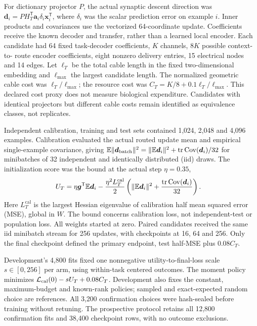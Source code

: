For dictionary projector $P$, the actual synaptic descent direction was
$\bm d_i=P H_T^{\mathsf T}\bm a_i\delta_i\bm x_i^{\mathsf T}$,
where $\delta_i$ was the scalar prediction error on example $i$. Inner products and covariances use the vectorized 64-coordinate update. Coefficients receive the known decoder and transfer, rather than a learned local encoder. Each candidate had
64 fixed task-decoder coefficients, $K$ channels, $8K$ possible context-to-
route encoder coefficients, eight nonzero delivery entries, 15 electrical
nodes and 14 edges. Let $\ell_T$ be the total cable length in the fixed two-dimensional
embedding and $\ell_{\max}$ the largest candidate length. The normalized
geometric cable cost was $\ell_T/\ell_{\max}$; the resource cost was
$C_T=K/8+0.1\ell_T/\ell_{\max}$. This declared cost proxy does not measure biological expenditure. Candidates with identical projectors but different cable costs remain identified as equivalence classes, not replicates.

Independent calibration, training and test sets contained 1,024, 2,048 and
4,096 examples. Calibration evaluated the actual routed update mean and
empirical single-example covariance, giving
$\mathbb{E}\|\bm d_{\mathrm{batch}}\|^2
=\|\mathbb{E}\bm d_i\|^2+\operatorname{tr}\operatorname{Cov}(\bm d_i)/32$
for minibatches of 32 independent and identically distributed (iid) draws. The initialization score was the bound at the
actual step $\eta=0.35$,
\[
U_T=\eta\bm g^{\mathsf T}\mathbb{E}\bm d_i-
\frac{\eta^2L_T^{\mathrm{cal}}}{2}
\left(\|\mathbb{E}\bm d_i\|^2+
\frac{\operatorname{tr}\operatorname{Cov}(\bm d_i)}{32}\right).
\]
Here $L_T^{\mathrm{cal}}$ is the largest Hessian eigenvalue of calibration half mean squared error (MSE), global in $W$. The bound concerns calibration loss, not independent-test or population loss. All weights
started at zero. Paired candidates received the same iid minibatch stream
for 256 updates, with checkpoints at 16, 64 and 256. Only the final checkpoint
defined the primary endpoint, test half-MSE plus $0.08C_T$.

Development's 4,800 fits fixed one nonnegative utility-to-final-loss scale $s\in[0,256]$ per arm, using within-task centered outcomes. The moment policy minimizes $\mathcal L_{\rm cal}(0)-sU_T+0.08C_T$. Development also fixes the constant, maximum-budget and known-rank policies; sampled and exact-expected random choice are references. All 3,200 confirmation choices were hash-sealed before training without retuning. The prospective protocol retains all 12,800 confirmation fits and 38,400 checkpoint rows, with no outcome exclusions.

